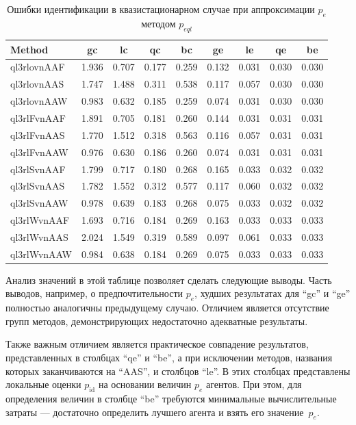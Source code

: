 \begin{table}[htb!]
  \caption{Ошибки идентификации в квазистационарном случае при аппроксимации $p_e$ методом $p_{eql}$}
  \label{atu:t:err_test_id_ql}
  \begin{center}
    \begin{tabular}{|l|c|c|c|c|c|c|c|c|}
    \hline
    Method      & gc    & lc    & qc    & bc    & ge     & le    & qe    & be    \\ \hline
    ql3rlovnAAF & 1.936 & 0.707 & 0.177 & 0.259 & 0.132  & 0.031 & 0.030 & 0.030 \\ \hline
    ql3rlovnAAS & 1.747 & 1.488 & 0.311 & 0.538 & 0.117  & 0.057 & 0.030 & 0.030 \\ \hline
    ql3rlovnAAW & 0.983 & 0.632 & 0.185 & 0.259 & 0.074  & 0.031 & 0.030 & 0.030 \\ \hline
    ql3rlFvnAAF & 1.891 & 0.705 & 0.181 & 0.260 & 0.144  & 0.031 & 0.031 & 0.031 \\ \hline
    ql3rlFvnAAS & 1.770 & 1.512 & 0.318 & 0.563 & 0.116  & 0.057 & 0.031 & 0.031 \\ \hline
    ql3rlFvnAAW & 0.976 & 0.630 & 0.186 & 0.260 & 0.074  & 0.031 & 0.031 & 0.031 \\ \hline
    ql3rlSvnAAF & 1.799 & 0.717 & 0.180 & 0.268 & 0.165  & 0.033 & 0.032 & 0.032 \\ \hline
    ql3rlSvnAAS & 1.782 & 1.552 & 0.312 & 0.577 & 0.117  & 0.060 & 0.032 & 0.032 \\ \hline
    ql3rlSvnAAW & 0.978 & 0.639 & 0.183 & 0.268 & 0.075  & 0.033 & 0.032 & 0.032 \\ \hline
    ql3rlWvnAAF & 1.693 & 0.716 & 0.184 & 0.269 & 0.163  & 0.033 & 0.033 & 0.033 \\ \hline
    ql3rlWvnAAS & 2.024 & 1.549 & 0.319 & 0.589 & 0.097  & 0.061 & 0.033 & 0.033 \\ \hline
    ql3rlWvnAAW & 0.984 & 0.638 & 0.184 & 0.269 & 0.075  & 0.033 & 0.033 & 0.033 \\ \hline
    \end{tabular}
  \end{center}
\end{table}

Анализ значений в этой таблице позволяет сделать следующие выводы.
Часть выводов, например, о предпочтительности $p_e$,
худших результатах для ``gc'' и ``ge'' полностью аналогичны
предыдущему случаю. Отличием является отсутствие групп
методов, демонстрирующих недостаточно адекватные результаты.

Также важным отличием является практическое совпадение
результатов, представленных в столбцах ``qe'' и ``be'',
а при исключении методов, названия которых заканчиваются на ``AAS'',
и столбцов ``le''. В этих столбцах представлены локальные оценки $p_\mathrm{id}$
на основании величин $p_e$ агентов. При этом,
для определения величин в столбце ``be'' требуются минимальные вычислительные
затраты --- достаточно определить лучшего агента и взять его значение~$p_e$.

